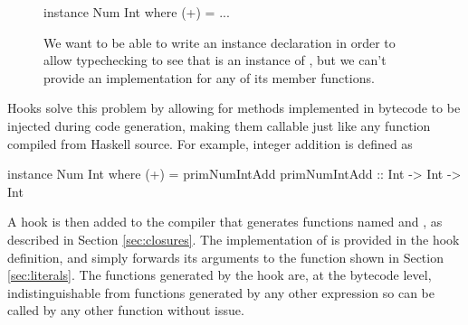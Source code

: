 \documentclass[dissertation.tex]{subfiles}
\begin{document}
{{        \begin{figure}[h]
        \begin{haskellfigure}
        instance Num Int where
            (+) = ...
        \end{haskellfigure}
        \caption{We want to be able to write an instance declaration in order to allow typechecking to see that  is an instance of , but we can't provide an implementation for any of its member functions.}
        \end{figure}

        Hooks solve this problem by allowing for methods implemented in bytecode to be injected during code generation, making them callable just like any function compiled from Haskell source. For example, integer addition is defined as 

        \begin{haskellfigure}
        instance Num Int where
            (+) = primNumIntAdd
        primNumIntAdd :: Int -> Int -> Int
        \end{haskellfigure}

        A hook is then added to the compiler that generates functions named  and , as described in Section \ref{sec:closures}. The implementation of  is provided in the hook definition, and simply forwards its arguments to the  function shown in Section \ref{sec:literals}. The functions generated by the hook are, at the bytecode level, indistinguishable from functions generated by any other expression so can be called by any other function without issue.
    }
}
\end{document}

